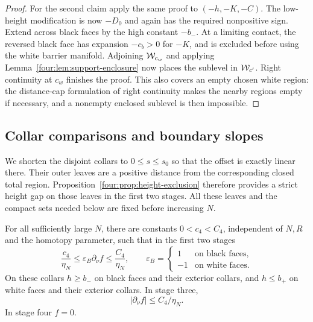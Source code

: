 \begin{proof}
For the second claim apply the same proof to
$(-h,-K,-C)$.  The low-height modification is now $-D_0$ and again
has the required nonpositive sign.  Extend across black faces by
the high constant $-b_-$.  At a limiting contact, the reversed black
face has expansion $-c_b>0$ for $-K$, and is excluded before using
the white barrier manifold.  Adjoining $\mathcal W_{c_w}$ and applying
Lemma~\ref{four:lem:support-enclosure} now places the sublevel in
$\mathcal W_{c'}$.  Right continuity at $c_w$ finishes the proof.  This also
covers an empty chosen white region: the distance-cap formulation
of right continuity makes the nearby regions empty if necessary,
and a nonempty enclosed sublevel is then impossible.
\end{proof}

\subsection{Collar comparisons and boundary slopes}

We shorten the disjoint collars to $0\le s\le s_0$ so that the offset
is exactly linear there.  Their outer leaves are a positive distance
from the corresponding closed total region.  Proposition~\ref{four:prop:height-exclusion}
therefore provides a strict height gap on those leaves in the first
two stages.  All these leaves and the compact sets needed below are
fixed before increasing $N$.

\begin{lemma}\label{four:bnd:collar-slopes}
For all sufficiently large $N$, there are constants $0<c_4<C_4$,
independent of $N,R$ and the homotopy parameter, such that in the
first two stages
\begin{equation}\label{four:bnd:signed-slopes}
 \frac{c_4}{\eta_N}\le\varepsilon_B\partial_\nu f
 \le\frac{C_4}{\eta_N},\qquad
 \varepsilon_B=\begin{cases}1&\text{on black faces},\\-1&\text{on white faces}.
 \end{cases}
\end{equation}
On these collars $h\ge b_-$ on black faces and their exterior
collars, and $h\le b_+$ on white faces and their exterior collars.
In stage three,
\begin{equation}\label{four:bnd:third-slopes}
 |\partial_\nu f|\le C_4/\eta_N.
\end{equation}
In stage four $f=0$.
\end{lemma}

